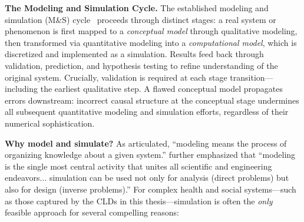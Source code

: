 \medskip
\noindent
\textbf{The Modeling and Simulation Cycle.} The established modeling and simulation (M\&S) cycle~\citep{ziegler1976theory, cellier1990continuous} proceeds through distinct stages: a real system or phenomenon is first mapped to a \emph{conceptual model} through qualitative modeling, then transformed via quantitative modeling into a \emph{computational model}, which is discretized and implemented as a simulation. Results feed back through validation, prediction, and hypothesis testing to refine understanding of the original system. Crucially, validation is required at each stage transition—including the earliest qualitative step. A flawed conceptual model propagates errors downstream: incorrect causal structure at the conceptual stage undermines all subsequent quantitative modeling and simulation efforts, regardless of their numerical sophistication.

\medskip
\noindent
\textbf{Why model and simulate?} As \citet{ziegler1976theory} articulated, ``modeling means the process of organizing knowledge about a given system.'' \citet{cellier1990continuous} further emphasized that ``modeling is the single most central activity that unites all scientific and engineering endeavors... simulation can be used not only for analysis (direct problems) but also for design (inverse problems).'' For complex health and social systems---such as those captured by the CLDs in this thesis---simulation is often the \emph{only} feasible approach for several compelling reasons:

